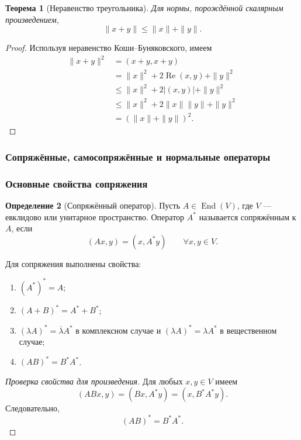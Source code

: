 \documentclass[12pt,a4paper]{article}
\theoremstyle{definition}
\newtheorem{definition}{Определение}[section]
\theoremstyle{plain}
\newtheorem{theorem}[definition]{Теорема}
\theoremstyle{remark}
\newcommand{\End}{\operatorname{End}}
\begin{document}
\begin{theorem}[Неравенство треугольника]
Для нормы, порождённой скалярным произведением,
\[
    \|x+y\|\le \|x\|+\|y\|.
\]
\end{theorem}

\begin{proof}
Используя неравенство Коши--Буняковского, имеем
\[
\begin{aligned}
    \|x+y\|^2
    &=(x+y,x+y)\\
    &=\|x\|^2+2\operatorname{Re}(x,y)+\|y\|^2\\
    &\le \|x\|^2+2|(x,y)|+\|y\|^2\\
    &\le \|x\|^2+2\|x\|\|y\|+\|y\|^2\\
    &=(\|x\|+\|y\|)^2.
\end{aligned}
\]
\end{proof}

\subsubsection{Сопряжённые, самосопряжённые и нормальные операторы}

\subsubsection*{Основные свойства сопряжения}

\begin{definition}[Сопряжённый оператор]
Пусть $A\in\End(V)$, где $V$ --- евклидово или унитарное пространство.
Оператор $A^*$ называется сопряжённым к $A$, если
\[
    (Ax,y)=(x,A^*y)
    \qquad \forall x,y\in V.
\]
\end{definition}

Для сопряжения выполнены свойства:
\begin{enumerate}[label=\arabic*)]
    \item $(A^*)^*=A$;
    \item $(A+B)^*=A^*+B^*$;
    \item $(\lambda A)^*=\overline{\lambda}A^*$ в комплексном случае и $(\lambda A)^*=\lambda A^*$ в вещественном случае;
    \item $(AB)^*=B^*A^*$.
\end{enumerate}

\begin{proof}[Проверка свойства для произведения]
Для любых $x,y\in V$ имеем
\[
    (ABx,y)=(Bx,A^*y)=(x,B^*A^*y).
\]
Следовательно,
\[
    (AB)^*=B^*A^*.
\]
\end{proof}
\end{document}
